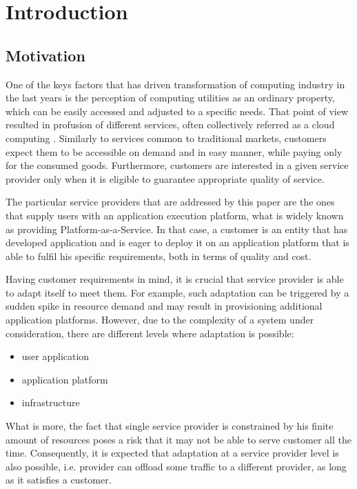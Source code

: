 \chapter{Introduction}

\section{Motivation}
One of the keys factors that has driven transformation of computing industry in the last years is the perception of computing utilities as an ordinary property, which can be easily accessed and adjusted to a specific needs. That point of view resulted in profusion of different services, often collectively referred as a cloud computing \cite{MeGr11}. Similarly to services common to traditional markets, customers expect them to be accessible on demand and in easy manner, while paying only for the consumed goods. Furthermore, customers are interested in a given service provider only when it is eligible to guarantee appropriate quality of service.

The particular service providers that are addressed by this paper are the ones that supply users with an application execution platform, what is widely known as providing Platform-as-a-Service. In that case, a customer is an entity that has developed application and is eager to deploy it on an application platform that is able to fulfil his specific requirements, both in terms of quality and cost.

Having customer requirements in mind, it is crucial that service provider is able to adapt itself to meet them. For example, such adaptation can be triggered by a sudden spike in resource demand and may result in provisioning additional application platforms. However, due to the complexity of a system under consideration, there are different levels where adaptation is possible:
\begin{itemize}
	\item user application
	\item application platform
	\item infrastructure
\end{itemize} 
What is more, the fact that single service provider is constrained by his finite amount of resources poses a risk that it may not be able to serve customer all the time. Consequently, it is expected that adaptation at a service provider level is also possible, i.e. provider can offload some traffic to a different provider, as long as it satisfies a customer.

